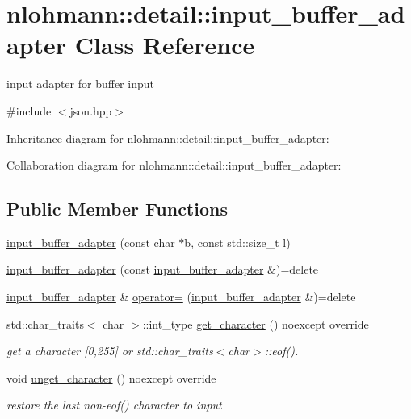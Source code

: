 \hypertarget{classnlohmann_1_1detail_1_1input__buffer__adapter}{}\section{nlohmann\+:\+:detail\+:\+:input\+\_\+buffer\+\_\+adapter Class Reference}
\label{classnlohmann_1_1detail_1_1input__buffer__adapter}


input adapter for buffer input  




{\ttfamily \#include $<$json.\+hpp$>$}



Inheritance diagram for nlohmann\+:\+:detail\+:\+:input\+\_\+buffer\+\_\+adapter\+:


Collaboration diagram for nlohmann\+:\+:detail\+:\+:input\+\_\+buffer\+\_\+adapter\+:
\subsection*{Public Member Functions}
\begin{DoxyCompactItemize}
\item 
\hyperlink{classnlohmann_1_1detail_1_1input__buffer__adapter_aee9d094d369bcd8f110eae4a175a8fa9}{input\+\_\+buffer\+\_\+adapter} (const char $\ast$b, const std\+::size\+\_\+t l)
\item 
\hyperlink{classnlohmann_1_1detail_1_1input__buffer__adapter_ada76d7b75c5d6b989af0e18687ef07b6}{input\+\_\+buffer\+\_\+adapter} (const \hyperlink{classnlohmann_1_1detail_1_1input__buffer__adapter}{input\+\_\+buffer\+\_\+adapter} \&)=delete
\item 
\hyperlink{classnlohmann_1_1detail_1_1input__buffer__adapter}{input\+\_\+buffer\+\_\+adapter} \& \hyperlink{classnlohmann_1_1detail_1_1input__buffer__adapter_a0871125057d993684ba8e45fb2b8a76b}{operator=} (\hyperlink{classnlohmann_1_1detail_1_1input__buffer__adapter}{input\+\_\+buffer\+\_\+adapter} \&)=delete
\item 
std\+::char\+\_\+traits$<$ char $>$\+::int\+\_\+type \hyperlink{classnlohmann_1_1detail_1_1input__buffer__adapter_ae9e195b04f3551fafb0925aafba00124}{get\+\_\+character} () noexcept override
\begin{DoxyCompactList}\small\item\em get a character \mbox{[}0,255\mbox{]} or std\+::char\+\_\+traits$<$char$>$\+::eof(). \end{DoxyCompactList}\item 
void \hyperlink{classnlohmann_1_1detail_1_1input__buffer__adapter_ae2464d8e963d2ae617b080f2df2550a1}{unget\+\_\+character} () noexcept override
\begin{DoxyCompactList}\small\item\em restore the last non-\/eof() character to input \end{DoxyCompactList}\end{DoxyCompactItemize}
